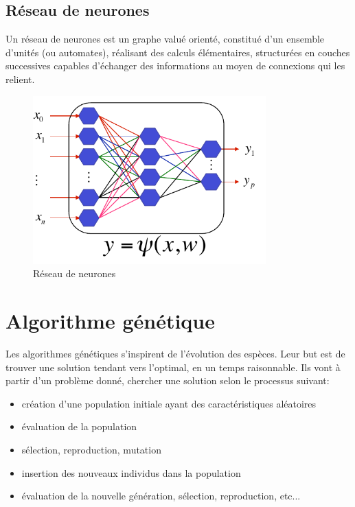 \subsection{Réseau de neurones}
Un réseau de neurones est un graphe valué orienté, constitué d’un ensemble d’unités (ou automates), réalisant des calculs élémentaires, structurées en couches successives capables d’échanger des informations
au moyen de connexions qui les relient.

\begin{figure}[H]
    \centering
    \includegraphics[width=0.8\textwidth]{./pictures/reseau_de_neurones.png}
    \caption{Réseau de neurones}
\end{figure}
\clearpage


\section{Algorithme génétique}
Les algorithmes génétiques s'inspirent de l'évolution des espèces. Leur but est de trouver une solution tendant vers l'optimal, en un temps raisonnable. Ils vont à partir d'un problème donné, chercher une solution selon le processus suivant: 

\begin{itemize}
\item création d'une population initiale ayant des caractéristiques aléatoires
\item évaluation de la population
\item sélection, reproduction, mutation
\item insertion des nouveaux individus dans la population
\item évaluation de la nouvelle génération, sélection, reproduction, etc...\\
\end{itemize}


